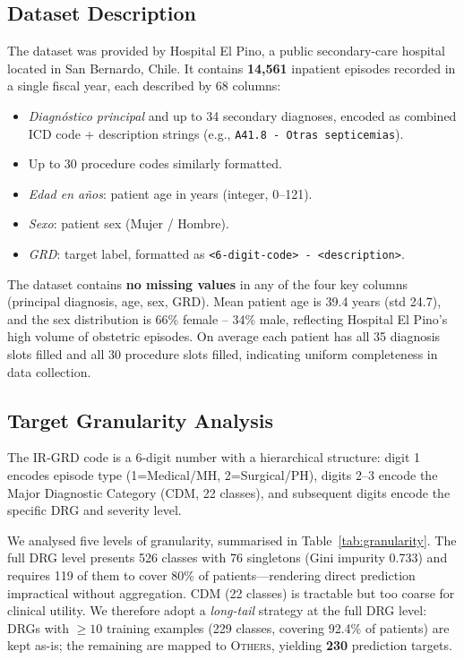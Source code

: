 \documentclass{IEEEtran}
\begin{document}
\subsection{Dataset Description}

The dataset was provided by Hospital El Pino, a public secondary-care
hospital located in San Bernardo, Chile.
It contains \textbf{14{,}561} inpatient episodes recorded in a
single fiscal year, each described by 68 columns:
\begin{itemize}
  \item \textit{Diagnóstico principal} and up to 34 secondary
        diagnoses, encoded as combined ICD code + description
        strings (e.g., \texttt{A41.8 - Otras septicemias}).
  \item Up to 30 procedure codes similarly formatted.
  \item \textit{Edad en años}: patient age in years (integer, 0–121).
  \item \textit{Sexo}: patient sex (Mujer / Hombre).
  \item \textit{GRD}: target label, formatted as
        \texttt{<6-digit-code> - <description>}.
\end{itemize}

The dataset contains \textbf{no missing values} in any of the four
key columns (principal diagnosis, age, sex, GRD).
Mean patient age is 39.4 years (std 24.7), and the sex distribution
is 66\% female – 34\% male, reflecting Hospital El Pino's high
volume of obstetric episodes.
On average each patient has all 35 diagnosis slots filled and all 30
procedure slots filled, indicating uniform completeness in data
collection.

\subsection{Target Granularity Analysis}

The IR-GRD code is a 6-digit number with a hierarchical structure:
digit 1 encodes episode type (1=Medical/MH, 2=Surgical/PH),
digits 2–3 encode the Major Diagnostic Category (CDM, 22 classes),
and subsequent digits encode the specific DRG and severity level.

We analysed five levels of granularity, summarised in
Table~\ref{tab:granularity}.
The full DRG level presents 526 classes with 76 singletons
(Gini impurity 0.733) and requires 119 of them to cover 80\%
of patients—rendering direct prediction impractical without
aggregation.
CDM (22 classes) is tractable but too coarse for clinical utility.
We therefore adopt a \emph{long-tail} strategy at the full DRG
level: DRGs with $\geq 10$ training examples (229 classes, covering
92.4\% of patients) are kept as-is; the remaining are mapped to
\textsc{Others}, yielding \textbf{230} prediction targets.
\end{document}
